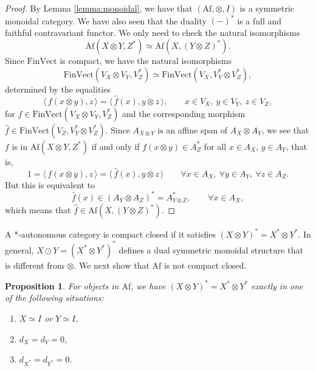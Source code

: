 \documentclass[12pt]{article}
\newtheorem{prop}{Proposition}
\theoremstyle{definition}
\theoremstyle{remark}
\def\<{\langle\,}
\def\>{\,\rangle}
\def \Af{\mathrm{Af}}
\def \FV{\mathrm{FinVect}}
\begin{document}
\begin{proof} By Lemma \ref{lemma:monoidal}, we have that $(\Af,\otimes, I)$ is a symmetric
monoidal category. We have also seen that the duality $(-)^*$ is a full and faithful
contravariant functor. We only need to check the natural isomorphisms 
\[
\Af(X\otimes Y,Z^*)\simeq \Af(X,(Y\otimes Z)^*).
\]
Since $\FV$ is compact, we have the natural isomorphisms
\[
\FV(V_X\otimes V_Y,V^*_Z)\simeq \FV(V_X,V_Y^*\otimes V_Z^*),
\]
determined by the equalities
\[
\<f(x\otimes y),z\>=\<\hat f(x),y\otimes z\>,\qquad x\in V_X,\ y\in V_Y,\ z\in V_Z,
\]
for $f\in \FV(V_X\otimes V_Y,V_Z^*)$ and the corresponding morphism  $\hat f\in \FV(V_Z,V_Y^*\otimes V_Z^*)$. Since
$A_{X\otimes Y}$ is an affine span of $A_X\otimes A_Y$, we see that
$f$ is in $\Af(X\otimes Y, Z^*)$ if and only if $f(x\otimes y)\in A^*_Z$ for all $x\in A_X$, $y\in
A_Y$, that is, 
\[
1=\<f(x\otimes y),z\>=\<\hat f(x),y\otimes z\>\qquad \forall x\in A_X,\
\forall y\in A_Y,\ \forall z\in A_Z.
\]
But this is equivalent to
\[
\hat f(x)\in (A_Y\otimes A_Z)^*=A^*_{Y\otimes Z},\qquad \forall x\in A_X,
\]
which means that $\hat f\in \Af(X, (Y\otimes Z)^*)$.

\end{proof}
A *-autonomous category is compact closed if it satisfies $(X\otimes Y)^*=X^*\otimes
Y^*$. 
In general, $X\odot Y=(X^*\otimes Y^*)^*$ defines a dual symmetric monoidal
structure that is different from $\otimes$. 
We next show that $\Af$ is not compact closed.

\begin{prop}\label{prop:noncompact} For objects in $\Af$, we have $(X\otimes
Y)^*=X^*\otimes Y^*$ exactly in one of the following situations:
\begin{enumerate}
\item[(i)] $X\simeq I$ or $Y\simeq I$,
\item[(ii)] $d_X=d_Y=0$,
\item[(iii)] $d_{X^*}=d_{Y^*}=0$.
\end{enumerate}



\end{prop}
\end{document}
